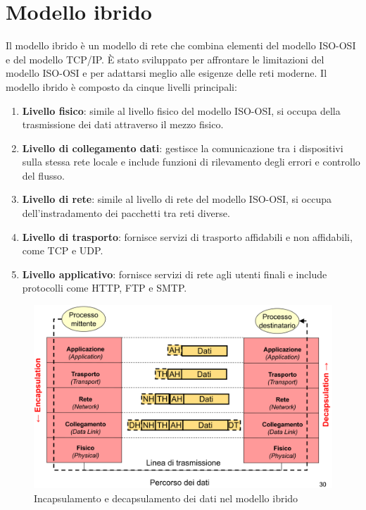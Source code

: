 \newpage
\section{Modello ibrido}
Il modello ibrido è un modello di rete che combina elementi del modello ISO-OSI e del modello TCP/IP. È stato sviluppato per affrontare le limitazioni del modello ISO-OSI e per adattarsi meglio alle esigenze delle reti moderne.
Il modello ibrido è composto da cinque livelli principali:
\begin{enumerate}
    \item \textbf{Livello fisico}: simile al livello fisico del modello ISO-OSI, si occupa della trasmissione dei dati attraverso il mezzo fisico.
    \item \textbf{Livello di collegamento dati}: gestisce la comunicazione tra i dispositivi sulla stessa rete locale e include funzioni di rilevamento degli errori e controllo del flusso.
    \item \textbf{Livello di rete}: simile al livello di rete del modello ISO-OSI, si occupa dell'instradamento dei pacchetti tra reti diverse.
    \item \textbf{Livello di trasporto}: fornisce servizi di trasporto affidabili e non affidabili, come TCP e UDP.
    \item \textbf{Livello applicativo}: fornisce servizi di rete agli utenti finali e include protocolli come HTTP, FTP e SMTP.
    \end{enumerate}

    \begin{figure}[h!]
    \centering
    \includegraphics[width=1\textwidth]{images/enc_dec_ibrido.png}
    \caption{Incapsulamento e decapsulamento dei dati nel modello ibrido}
    \label{fig:modello_ibrido_enc_decapsulamento}
\end{figure}


